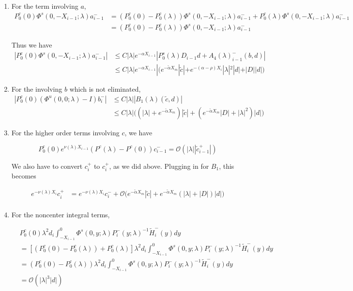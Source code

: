 \documentclass[12pt]{article}
\begin{document}
\begin{enumerate}
\item For the term involving $a$,
\begin{align*}
P_0^c(0) \Phi^s(0, -X_{i-1}; \lambda) a_{i-1}^- &= 
(P_0^c(0) - P_0^c(\lambda)) \Phi^s(0, -X_{i-1}; \lambda) a_{i-1}^- + P_0^c(\lambda) \Phi^s(0, -X_{i-1}; \lambda) a_{i-1}^- \\
&= (P_0^c(0) - P_0^c(\lambda)) \Phi^s(0, -X_{i-1}; \lambda) a_{i-1}^-
\end{align*}

Thus we have
\begin{align*}
|P_0^c(0) \Phi^s(0, -X_{i-1}; \lambda) a_{i-1}^-| 
&\leq C |\lambda| e^{-\alpha X_{i-1}}| P_0^s(\lambda) D_{i-1} d + A_4(\lambda)_{i-1}^-(b, d)| \\
&\leq C |\lambda| e^{-\alpha X_{i-1}}| \Big( e^{-\tilde{\alpha} X_m} |\tilde{c}| + e^{-(\alpha - \rho) X_i} |\lambda|^2|d| + |D||d| \Big)
\end{align*}

\item For the involving $b$ which is not eliminated,
\begin{align*}
|P_0^c(0)  (\Phi^u(0, 0; \lambda) - I)b_i^-| &\leq C |\lambda| |B_1(\lambda)(\tilde{c}, d)| \\
&\leq  C |\lambda| \Big( (|\lambda| + e^{-\tilde{\alpha}X_m})|\tilde{c}|
+ (e^{-\tilde{\alpha}X_m}|D| 
+ |\lambda|^2)|d| \Big)
\end{align*}

\item For the higher order terms involving $c$, we have

\[
P_0^c(0) e^{\nu(\lambda) X_{i-1}} (P^c(\lambda) - P^c(0))c_{i-1}^- 
= \mathcal{O}(|\lambda||\tilde{c}_{i-1}^+|)
\]

We also have to convert $c_i^+$ to $c_i^+$, as we did above. Plugging in for $B_1$, this becomes

\begin{align*}
e^{-\nu(\lambda)X_i} c_i^+ &= e^{-\nu(\lambda)X_i} c_i^- + \mathcal{O}\Big( e^{-\tilde{\alpha} X_m} |\tilde{c}| + e^{-\tilde{\alpha} X_m}(|\lambda| + |D| ) |d| \Big) \\
\end{align*}

\item For the noncenter integral terms,

\begin{align*}
&P_0^c(0) \lambda^2 d_i \int_{-X_{i-1}}^0 \Phi^s(0, y; \lambda) P_i^-(y; \lambda)^{-1} \tilde{H}_i^-(y) dy \\
&= [(P_0^c(0) - P_0^c(\lambda)) + P_0^c(\lambda)] \lambda^2 d_i \int_{-X_{i-1}}^0 \Phi^s(0, y; \lambda) P_i^-(y; \lambda)^{-1} \tilde{H}_i^-(y) dy \\
&= (P_0^c(0) - P_0^c(\lambda)) \lambda^2 d_i \int_{-X_{i-1}}^0 \Phi^s(0, y; \lambda) P_i^-(y; \lambda)^{-1} \tilde{H}_i^-(y) dy \\
&= \mathcal{O}(|\lambda|^3 |d| )
\end{align*}

\end{enumerate}
\end{document}
